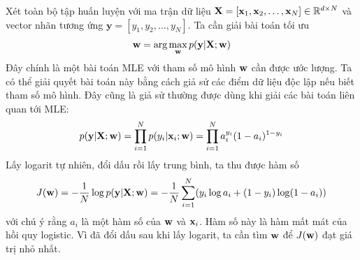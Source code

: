 Xét toàn bộ tập huấn luyện với ma trận dữ liệu $\mathbf{X} =
[\mathbf{x}_1,\mathbf{x}_2, \dots, \mathbf{x}_N] \in \mathbb{R}^{d \times N}$ và
vector nhãn tương ứng $\mathbf{y} = [y_1, y_2, \dots, y_N]$. Ta
cần giải bài toán tối ưu%
\begin{equation}
\label{eqn:10_1_7}
\mathbf{w} = \arg\max_{\mathbf{w}} p(\mathbf{y}|\mathbf{X}; \mathbf{w})
\end{equation}
Đây chính là một bài toán MLE với tham số mô hình
$\mathbf{w}$ cần được ước lượng. Ta có thể giải quyết bài toán này bằng cách giả sử các điểm dữ liệu độc lập nếu biết tham số mô hình. Đây cũng là giả sử thường được dùng khi giải các bài toán liên quan tới MLE:
\begin{equation}
p(\mathbf{y}|\mathbf{X}; \mathbf{w}) = \prod_{i=1}^N p(y_i| \mathbf{x}_i; \mathbf{w})
= \prod_{i=1}^N a_i^{y_i}(1 - a_i)^{1- y_i}
\end{equation}
Lấy logarit tự nhiên, đổi dấu rồi lấy trung bình, ta thu được hàm số
\begin{equation}
J(\mathbf{w}) = -\frac{1}{N}\log p(\mathbf{y}|\mathbf{X}; \mathbf{w})
= -\frac{1}{N}\sum_{i=1}^N(y_i \log a_i + (1-y_i) \log (1 - a_i))
\end{equation}
với chú ý rằng $a_i$ là một hàm số của $\mathbf{w}$ và $\mathbf{x}_i$. Hàm số này là hàm mất
mát của hồi quy logistic. Vì đã đổi dấu sau khi lấy logarit, ta cần tìm $\mathbf{w}$ để
$J(\mathbf{w})$ đạt giá trị nhỏ nhất.



